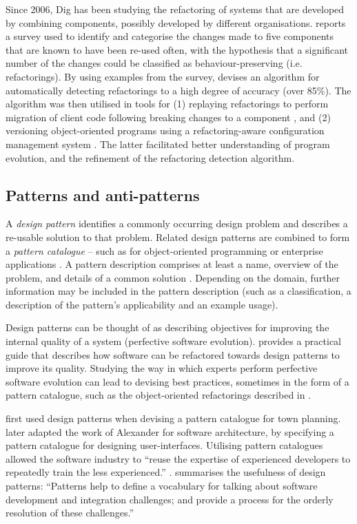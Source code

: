 Since 2006, Dig has been studying the refactoring of systems that are developed by combining components, possibly developed by different organisations. \cite{dig06apis} reports a survey used to identify and categorise the changes made to five components that are known to have been re-used often, with the hypothesis that a significant number of the changes could be classified as behaviour-preserving (i.e. refactorings). By using examples from the survey, \cite{dig06detection} devises an algorithm for automatically detecting refactorings to a high degree of accuracy (over 85\%). The algorithm was then utilised in tools for (1) replaying refactorings to perform migration of client code following breaking changes to a component \cite{dig06automatic}, and (2) versioning object-oriented programs using a refactoring-aware configuration management system \cite{dig07cms}. The latter facilitated better understanding of program evolution, and the refinement of the refactoring detection algorithm.


\subsection{Patterns and anti-patterns}
\label{sec:LitReviewPatterns}
A \textit{design pattern} identifies a commonly occurring design problem and describes a re-usable solution to that problem. Related design patterns are combined to form a \textit{pattern catalogue} -- such as for object-oriented programming \cite{gamma95patterns} or enterprise applications \cite{fowler02patterns}. A pattern description comprises at least a name, overview of the problem, and details of a common solution \cite{brown98antipatterns}. Depending on the domain, further information may be included in the pattern description (such as a classification, a description of the pattern's applicability and an example usage).

Design patterns can be thought of as describing objectives for improving the internal quality of a system (perfective software evolution). \cite{kerievsky04refactoring} provides a practical guide that describes how software can be refactored towards design patterns to improve its quality. Studying the way in which experts perform perfective software evolution can lead to devising best practices, sometimes in the form of a pattern catalogue, such as the object-oriented refactorings described in \cite{fowler99refactoring}.

\cite{alexander77pattern} first used design patterns when devising a pattern catalogue for town planning. \cite{beck89constructing} later adapted the work of Alexander for software architecture, by specifying a pattern catalogue for designing user-interfaces. Utilising pattern catalogues allowed the software industry to ``reuse the expertise of experienced developers to repeatedly train the less experienced.'' \cite[pg. 10]{brown98antipatterns}. \cite[pg. xii]{rising01designpatterns} summarises the usefulness of design patterns: ``Patterns help to define a vocabulary for talking about software development and integration challenges; and provide a process for the orderly resolution of these challenges.'' 

